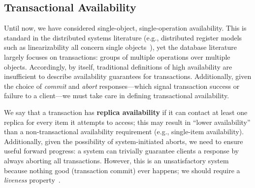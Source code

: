 



\subsection{Transactional Availability}

Until now, we have considered single-object, single-operation
availability. This is standard in the distributed systems literature
(e.g., distributed register models such as linearizability all concern
single objects~\cite{herlihy-art}), yet the database literature
largely focuses on transactions: groups of multiple operations over
multiple objects. Accordingly, by itself, traditional definitions of
high availability are insufficient to describe availability guarantees
for transactions. Additionally, given the choice of \textit{commit}
and \textit{abort} responses---which signal transaction success or
failure to a client---we must take care in defining transactional
availability.

We say that a transaction has \textbf{replica availability} if it can
contact at least one replica for every item it attempts to access;
this may result in ``lower availability'' than a non-transactional
availability requirement (e.g., single-item
availability). Additionally, given the possibility of system-initiated
aborts, we need to ensure useful forward progress: a system can
trivially guarantee clients a response by always aborting all
transactions. However, this is an unsatisfactory system because
nothing good (transaction commit) ever happens; we should require a
\textit{liveness} property~\cite{transaction-liveness}.

